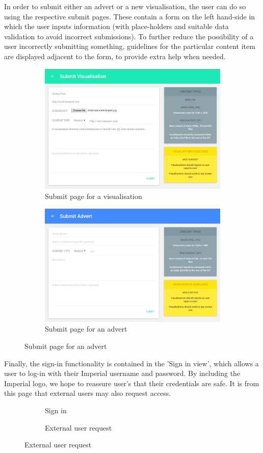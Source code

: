 \documentclass[a4paper, titlepage]{article}
\begin{document}
In order to submit either an advert or a new visualisation, the user can do so using the respective submit pages. These contain a form on the left hand-side in which the user inputs information (with place-holders and suitable data validation to avoid incorrect submissions). To further reduce the possibility of a user incorrectly submitting something, guidelines for the particular content item are displayed adjacent to the form, to provide extra help when needed. 

\begin{figure}[h!]
\begin{subfigure}{.5\textwidth}
  \centering
  \includegraphics[width=.6\textwidth]{./design/submit.jpg}
  \caption{Submit page for a visualisation}
\end{subfigure}
\begin{subfigure}{.5\textwidth}
  \centering
  \includegraphics[width=.6\textwidth]{./design/advert.jpg}
  \caption{Submit page for an advert}
\end{subfigure}
\end{figure}


Finally, the sign-in functionality is contained in the 'Sign in view', which allows a user to log-in with their Imperial username and password. By including the Imperial logo, we hope to reassure user's that their credentials are safe. It is from this page that external users may also request access.

\begin{figure}[h!]
\begin{subfigure}{.5\textwidth}
  \centering
  \caption{Sign in}

\end{subfigure}
\begin{subfigure}{.5\textwidth}
  \centering
  \caption{External user request}

\end{subfigure}
\end{figure}
\end{document}
